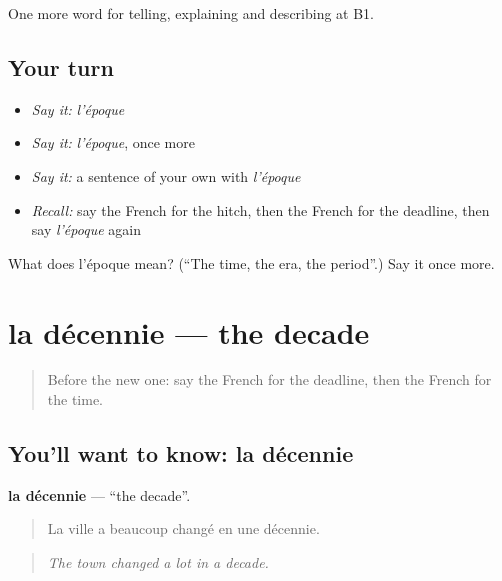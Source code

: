 \begin{grammarlens}[title={What you've built}]
One more word for telling, explaining and describing at B1.
\end{grammarlens}

\subsection*{Your turn}
\begin{itemize}
\raggedright
  \item \emph{Say it:} \emph{l'époque}
  \item \emph{Say it:} \emph{l'époque}, once more
  \item \emph{Say it:} a sentence of your own with \emph{l'époque}
  \item \emph{Recall:} say the French for the hitch, then the French for the deadline, then say \emph{l'époque} again
\end{itemize}

\begin{tcolorbox}[breakable,colback=teal!4,colframe=teal!35!black,title={Before you move on}]
What does l'époque mean? (\textquotedblleft{}The time, the era, the period\textquotedblright{}.) Say it once more.
\end{tcolorbox}
\section[la décennie]{la décennie — the decade}

\label{lesson:FR-C276-decennie}



\begin{quote}
Before the new one: say the French for the deadline, then the French for the time.
\end{quote}

\subsection*{You'll want to know: la décennie}
\textbf{la décennie} — \textquotedblleft{}the decade\textquotedblright{}.

\begin{quote}
La ville a beaucoup changé en une décennie.
\end{quote}

\begin{quote}
\emph{The town changed a lot in a decade.}
\end{quote}

